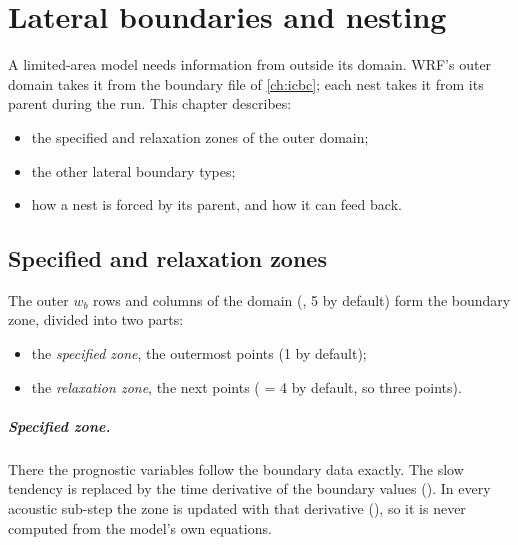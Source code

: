 \chapter{Lateral boundaries and nesting}\label{ch:bdy}

A limited-area model needs information from outside its domain. WRF's outer domain takes it from the boundary file
of \cref{ch:icbc}; each nest takes it from its parent during the run. This chapter describes:
\begin{itemize}
  \item the specified and relaxation zones of the outer domain;
  \item the other lateral boundary types;
  \item how a nest is forced by its parent, and how it can feed back.
\end{itemize}

\section{Specified and relaxation zones}

The outer $w_b$ rows and columns of the domain (, 5 by default) form the boundary zone,
divided into two parts:
\begin{itemize}
  \item the \emph{specified zone}, the outermost  points (1 by default);
  \item the \emph{relaxation zone}, the next  points ( = 4 by default, so three
    points).
\end{itemize}

\paragraph{Specified zone.} There the prognostic variables follow the boundary data exactly. The slow tendency is
replaced by the time derivative of the boundary values
(). In every acoustic sub-step the zone is updated with that derivative
(), so it is never computed from the model's own equations.

